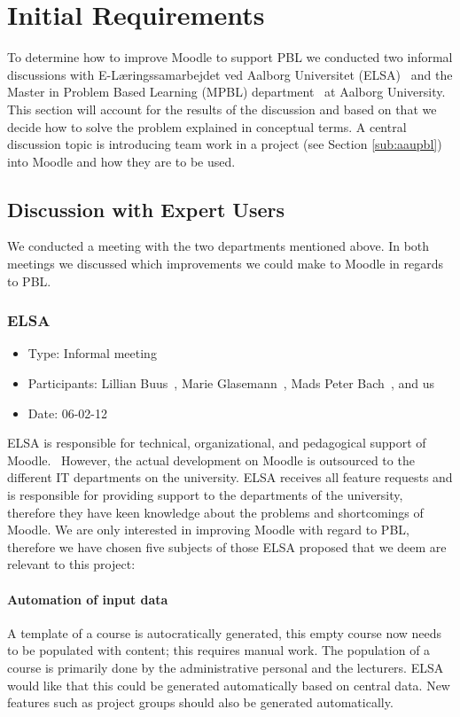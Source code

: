 \chapter{Initial Requirements}
\label{sec:initialAnalysis}
To determine how to improve Moodle to support PBL we conducted two informal discussions with E-L\ae{}ringssamarbejdet ved Aalborg Universitet (ELSA)~\cite{elsa} and the Master in Problem Based Learning (MPBL) department~\cite{mpbl} at Aalborg University.
This section will account for the results of the discussion and based on that we decide how to solve the problem explained in conceptual terms.
A central discussion topic is introducing team work in a project (see Section \ref{sub:aaupbl}) into Moodle and how they are to be used.

\section{Discussion with Expert Users}  
\label{sub:expertUsers} 
We conducted a meeting with the two departments mentioned above. 
In both meetings we discussed which improvements we could make to Moodle in regards to PBL.  

\subsection{ELSA}
\label{sub:elsaInterview}
\begin{itemize}
	\item Type: Informal meeting
	\item Participants: Lillian Buus~\cite{lillian}, Marie Glasemann~\cite{marie}, Mads Peter Bach~\cite{mads}, and us 
	\item Date: 06-02-12
\end{itemize}
ELSA is responsible for technical, organizational, and pedagogical support of Moodle.~\cite{elsa} 
However, the actual development on Moodle is outsourced to the different IT departments on the university. 
ELSA receives all feature requests and is responsible for providing support to the departments of the university, therefore they have keen knowledge about the problems and shortcomings of Moodle. 
We are only interested in improving Moodle with regard to PBL, therefore we have chosen five subjects of those ELSA proposed that we deem are relevant to this project:

\subsubsection{Automation of input data} A template of a course is autocratically generated, this empty course now needs to be populated with content; this requires manual work. 
The population of a course is primarily done by the administrative personal and the lecturers. 
ELSA would like that this could be generated automatically based on central data. 
New features such as project groups should also be generated automatically.

